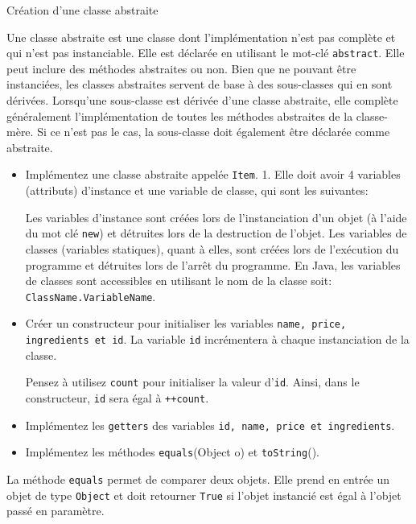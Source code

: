 \begin{Exercice}[10 minutes]{Création d'une classe abstraite}

	Une classe abstraite est une classe dont l'implémentation n'est pas complète et qui n'est pas instanciable. Elle est déclarée en utilisant le mot-clé \lstinline{abstract}. Elle peut inclure des méthodes abstraites ou non. Bien que ne pouvant être instanciées, les classes abstraites servent de base à des sous-classes qui en sont dérivées.
	Lorsqu'une sous-classe est dérivée d'une classe abstraite, elle complète généralement l'implémentation de toutes les méthodes abstraites de la classe-mère. Si ce n'est pas le cas, la sous-classe doit également être déclarée comme abstraite.
	
	 
	
	\begin{itemize}
		\item Implémentez une classe abstraite appelée \lstinline{Item}.
		1. Elle doit avoir 4 variables (attributs) d'instance et une variable de classe, qui sont les suivantes:
		 
		\begin{conseil}
			Les variables d'instance sont créées lors de l'instanciation d'un objet (à l'aide du mot clé \lstinline{new}) et détruites lors de la destruction de l'objet. Les variables de classes (variables statiques), quant à elles, sont créées lors de l'exécution du programme et détruites lors de l'arrêt du programme. En Java, les variables de classes sont accessibles en utilisant le nom de la classe soit: \lstinline{ClassName.VariableName}.
		\end{conseil}
		\item Créer un constructeur pour initialiser les variables \lstinline{name, price, ingredients et id}. La variable \lstinline{id} incrémentera à chaque instanciation de la classe.
		\begin{conseil}
			Pensez à utilisez \lstinline{count} pour initialiser la valeur d'\lstinline{id}. Ainsi, dans le constructeur, \lstinline{id} sera égal à \lstinline{++count}.
		\end{conseil}
		\item Implémentez les \lstinline{getters} des variables \lstinline{id, name, price et ingredients}.
		\item Implémentez les méthodes \lstinline{equals}(Object o) et \lstinline{toString}().
	\end{itemize}
	\begin{conseil}
	La méthode \lstinline{equals} permet de comparer deux objets. Elle prend en entrée un objet de type \lstinline{Object} et doit retourner \lstinline{True} si l'objet instancié est égal à l'objet passé en paramètre.
	\end{conseil}
		\begin{solution}  
			 
		\end{solution}
	\end{Exercice}
	
